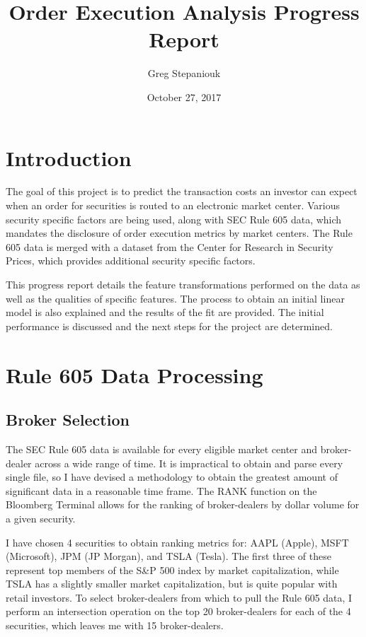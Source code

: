 \documentclass{article}
\title{Order Execution Analysis Progress Report}
\author{Greg Stepaniouk}
\date{October 27, 2017}
\begin{document}
\maketitle

\begin{multicols}{2}
\section{Introduction}
\setlength{\parindent}{1cm}
The goal of this project is to predict the transaction costs an investor can expect when an order for securities is routed to an electronic market center. Various security specific factors are being used, along with SEC Rule 605 data, which mandates the disclosure of order execution metrics by market centers. The Rule 605 data is merged with a dataset from the Center for Research in Security Prices, which provides additional security specific factors.
\par This progress report details the feature transformations performed on the data as well as the qualities of specific features. The process to obtain an initial linear model is also explained and the results of the fit are provided. The initial performance is discussed and the next steps for the project are determined.

\section{Rule 605 Data Processing}
\setlength{\parindent}{1cm}
\subsection{Broker Selection}
\par
The SEC Rule 605 data is available for every eligible market center and broker-dealer across a wide range of time. It is impractical to obtain and parse every single file, so I have devised a methodology to obtain the greatest amount of significant data in a reasonable time frame. The RANK function on the Bloomberg Terminal allows for the ranking of broker-dealers by dollar volume for a given security. 
\par
\par
I have chosen 4 securities to obtain ranking metrics for: AAPL (Apple), MSFT (Microsoft), JPM (JP Morgan), and TSLA (Tesla). The first three of these represent top members of the S\&P 500 index by market capitalization, while TSLA has a slightly smaller market capitalization, but is quite popular with retail investors. To select broker-dealers from which to pull the Rule 605 data, I perform an intersection operation on the top 20 broker-dealers for each of the 4 securities, which leaves me with 15 broker-dealers. 
\par

\end{multicols}
\end{document}
